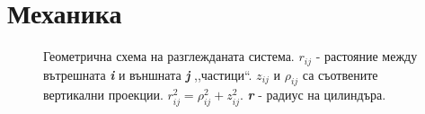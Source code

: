 \section{Механика}

\begin{figure}[h!]
    \centering 
    \caption{
        Геометрична схема на разглежданата система. $r_{ij}$ - растояние между вътрешната \textbf{\textit{i}} и външната \textbf{\textit{j}} ,,частици``. $z_{ij}$ и $\rho_{ij}$ са съотвените вертикални проекции. $r_{ij}^2 = \rho_{ij}^2 + z_{ij}^2$. \textbf{\textit{r}} - радиус на цилиндъра.}
    \label{fig:cylinder scheme}
\end{figure}